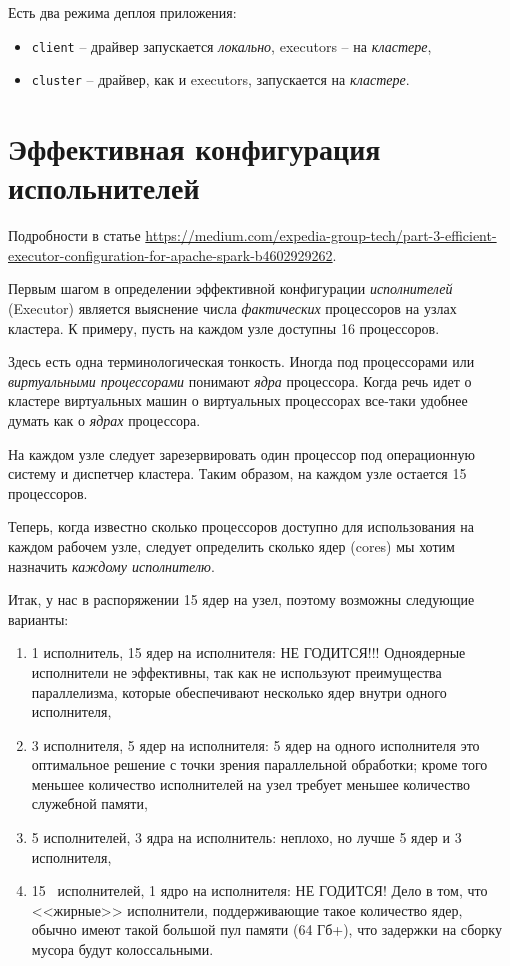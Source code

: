 \documentclass[%
	11pt,
	a4paper,
	utf8,
		]{article}
\begin{document}
Есть два режима деплоя приложения:
\begin{itemize}
	\item \texttt{client} -- драйвер запускается \emph{локально}, executors -- на \emph{кластере},
	
	\item \texttt{cluster} -- драйвер, как и executors, запускается на \emph{кластере}.
\end{itemize}

\section{Эффективная конфигурация испольнителей}

Подробности в статье \url{https://medium.com/expedia-group-tech/part-3-efficient-executor-configuration-for-apache-spark-b4602929262}.

Первым шагом в определении эффективной конфигурации \emph{исполнителей} (Executor) является выяснение числа \emph{фактических} процессоров на узлах кластера. К примеру, пусть на каждом узле доступны 16 процессоров.

Здесь есть одна терминологическая тонкость. Иногда под процессорами или \emph{виртуальными процессорами} понимают \emph{ядра} процессора. Когда речь идет о кластере виртуальных машин о виртуальных процессорах все-таки удобнее думать как о \emph{ядрах} процессора.

На каждом узле следует зарезервировать один процессор под операционную систему и диспетчер кластера. Таким образом, на каждом узле остается 15 процессоров.

Теперь, когда известно сколько процессоров доступно для использования на каждом рабочем узле, следует определить сколько ядер (cores) мы хотим назначить \emph{каждому исполнителю}.

Итак, у нас в распоряжении 15 ядер на узел, поэтому возможны следующие варианты:
\begin{enumerate}
	\item 1 исполнитель, 15 ядер на исполнителя: НЕ ГОДИТСЯ!!! Одноядерные исполнители не эффективны, так как не используют преимущества параллелизма, которые обеспечивают несколько ядер внутри одного исполнителя,
	
	\item 3 исполнителя, 5 ядер на исполнителя: 5 ядер на одного исполнителя это оптимальное решение с точки зрения параллельной обработки; кроме того меньшее количество исполнителей на узел требует меньшее количество служебной памяти,
	
	\item 5 исполнителей, 3 ядра на исполнитель: неплохо, но лучше 5 ядер и 3 исполнителя,
	
	\item 15  исполнителей, 1 ядро на исполнителя: НЕ ГОДИТСЯ! Дело в том, что <<жирные>> исполнители, поддерживающие такое количество ядер, обычно имеют такой большой пул памяти (64 Гб+), что задержки на сборку мусора будут колоссальными.
\end{enumerate}
\end{document}
